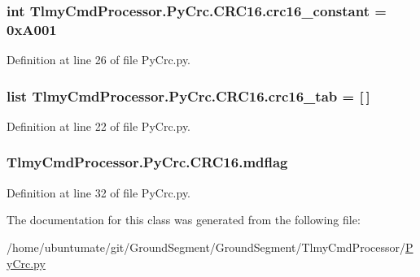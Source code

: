 \subsubsection[{crc16\+\_\+constant}]{\setlength{\rightskip}{0pt plus 5cm}int Tlmy\+Cmd\+Processor.\+Py\+Crc.\+C\+R\+C16.\+crc16\+\_\+constant = 0x\+A001\hspace{0.3cm}{\ttfamily [static]}}\label{class_tlmy_cmd_processor_1_1_py_crc_1_1_c_r_c16_a95c493f628de8e4da4850a721b083567}


Definition at line 26 of file Py\+Crc.\+py.

\hypertarget{class_tlmy_cmd_processor_1_1_py_crc_1_1_c_r_c16_a5ac464e6ba8820da42c067f186affdfe}{}
\subsubsection[{crc16\+\_\+tab}]{\setlength{\rightskip}{0pt plus 5cm}list Tlmy\+Cmd\+Processor.\+Py\+Crc.\+C\+R\+C16.\+crc16\+\_\+tab = \mbox{[}$\,$\mbox{]}\hspace{0.3cm}{\ttfamily [static]}}\label{class_tlmy_cmd_processor_1_1_py_crc_1_1_c_r_c16_a5ac464e6ba8820da42c067f186affdfe}


Definition at line 22 of file Py\+Crc.\+py.

\hypertarget{class_tlmy_cmd_processor_1_1_py_crc_1_1_c_r_c16_a4943c0b3e32ec33fd62efe9b07dc1ff9}{}
\subsubsection[{mdflag}]{\setlength{\rightskip}{0pt plus 5cm}Tlmy\+Cmd\+Processor.\+Py\+Crc.\+C\+R\+C16.\+mdflag}\label{class_tlmy_cmd_processor_1_1_py_crc_1_1_c_r_c16_a4943c0b3e32ec33fd62efe9b07dc1ff9}


Definition at line 32 of file Py\+Crc.\+py.



The documentation for this class was generated from the following file\+:\begin{DoxyCompactItemize}
\item 
/home/ubuntumate/git/\+Ground\+Segment/\+Ground\+Segment/\+Tlmy\+Cmd\+Processor/\hyperlink{_py_crc_8py}{Py\+Crc.\+py}\end{DoxyCompactItemize}
